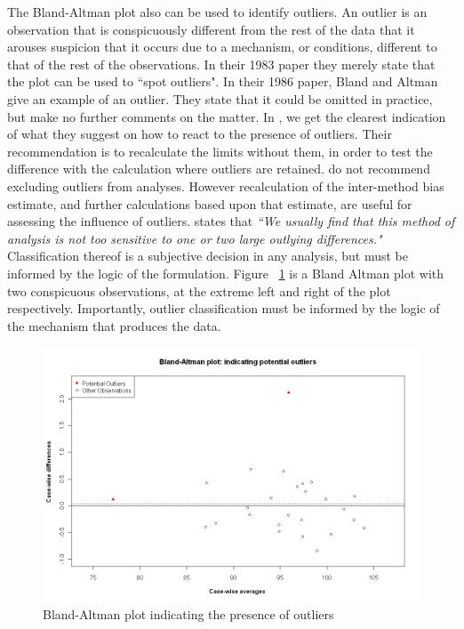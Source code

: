 \documentclass[12pt, a4paper]{report}
\theoremstyle{plain}
\theoremstyle{definition}
\theoremstyle{remark}
\begin{document}
The Bland-Altman plot also can be used to identify outliers. An outlier is an observation that is conspicuously different from the rest of the data that it arouses suspicion that it occurs due to a mechanism, or conditions, different to that of the rest of the observations. In their 1983 paper they merely state that the plot can be used to
``spot outliers". In their 1986 paper, Bland and Altman give an example of an
outlier. They state that it could be omitted in practice, but make
no further comments on the matter. In \citet{BA99}, we get the clearest indication of
what they suggest on how to react to the presence of
outliers. Their recommendation is to recalculate the limits
without them, in order to test the difference with the calculation
where outliers are retained. \citet*{BA99} do not recommend excluding outliers from analyses. However recalculation of the inter-method bias estimate, and further calculations based upon that estimate, are useful for assessing the influence of outliers. \citet{BA99} states that \emph{``We usually find that this method of analysis is not too sensitive to one or two large outlying differences."}
Classification thereof is a subjective decision in any analysis, but must be informed by the logic of the formulation. Figure ~\ref{BAOutliers} is a Bland Altman plot with two
conspicuous observations, at the extreme left and right of the
plot respectively. Importantly, outlier classification must be informed by the logic of the mechanism that produces the data.
	


	
	\begin{figure}[h!]
		\begin{center}
			\includegraphics[width=125mm]{images/BAOutliers.jpeg}
			\caption{Bland-Altman plot indicating the presence of outliers}\label{BAOutliers}
		\end{center}
	\end{figure}
 
\end{document}

